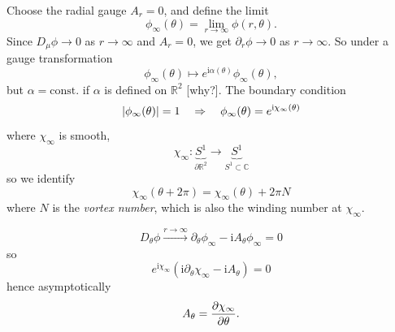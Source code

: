 \documentclass[a4paper,11pt]{article}
\begin{document}
    Choose the radial gauge $A_r = 0$, and define the limit
    \begin{equation}
        \phi_{\infty}(\theta) = \lim_{r \to \infty} \phi(r, \theta).
    \end{equation}
    Since $D_\mu \phi \to 0$ as $r \to \infty$ and $A_r = 0$, we get $\partial_r \phi \to 0$ as $r \to \infty$. So under a gauge transformation 
    \begin{equation}
        \phi_{\infty}(\theta) \mapsto e^{\mathrm{i} \alpha(\theta)} \phi_{\infty}(\theta),
    \end{equation}
    {\color{red} but $\alpha = \text{const.}$ if $\alpha$ is defined on $\mathbb{R}^2$ [why?]}. The boundary condition
    \begin{equation}
        \abs{\phi_\infty(\theta)} = 1 \quad \Rightarrow \quad \phi_\infty(\theta) = e^{\mathrm{i} \chi_\infty(\theta)}
    \end{equation}  
    where $\chi_\infty$ is smooth, 
    \begin{equation}
        \chi_\infty : \underbrace{S^1}_{\partial \mathbb{R}^2} \to \underbrace{S^1}_{S^1 \subset \mathbb{C}}
    \end{equation}
    so we identify 
    \begin{equation}
        \chi_\infty(\theta + 2 \pi) = \chi_\infty(\theta) + 2 \pi N
    \end{equation}
    where $N$ is the \emph{vortex number}, which is also the winding number at $\chi_\infty$.

    \begin{equation}
        D_\theta \phi \overset{r \to \infty}{\longrightarrow} \partial_\theta \phi_\infty - \mathrm{i} A_\theta \phi_\infty = 0
    \end{equation}
    so 
    \begin{equation}
        e^{\mathrm{i} \chi_\infty} \left( \mathrm{i} \partial_\theta \chi_\infty - \mathrm{i} A_\theta \right) = 0
    \end{equation}
    hence asymptotically 
    \begin{equation}
        A_\theta = \pdv{\chi_\infty}{\theta}.
    \end{equation}
\end{document}

